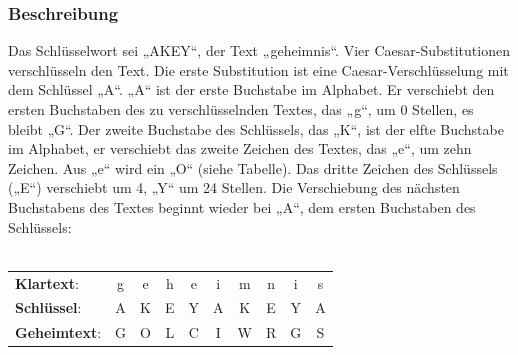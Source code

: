 \documentclass[10pt]{article}
\begin{document}
\subsubsection{Beschreibung}
Das Schlüsselwort sei „AKEY“, der Text „geheimnis“. Vier Caesar-Substitutionen verschlüsseln den Text. Die erste Substitution ist eine Caesar-Verschlüsselung mit dem Schlüssel „A“. „A“ ist der erste Buchstabe im Alphabet. Er verschiebt den ersten Buchstaben des zu verschlüsselnden Textes, das „g“, um 0 Stellen, es bleibt „G“. Der zweite Buchstabe des Schlüssels, das „K“, ist der elfte Buchstabe im Alphabet, er verschiebt das zweite Zeichen des Textes, das „e“, um zehn Zeichen. Aus „e“ wird ein „O“ (siehe Tabelle). Das dritte Zeichen des Schlüssels („E“) verschiebt um 4, „Y“ um 24 Stellen. Die Verschiebung des nächsten Buchstabens des Textes beginnt wieder bei „A“, dem ersten Buchstaben des Schlüssels: \\ \\
\begin{tabular}{l c c c c c c c c c }
	\textbf{Klartext}: & g & e & h & e & i & m & n & i & s \\
	\textbf{Schlüssel}: & A & K & E & Y & A & K & E & Y & A \\
	\textbf{Geheimtext}: & G & O & L & C & I & W & R & G & S 
\end{tabular}
\end{document}
